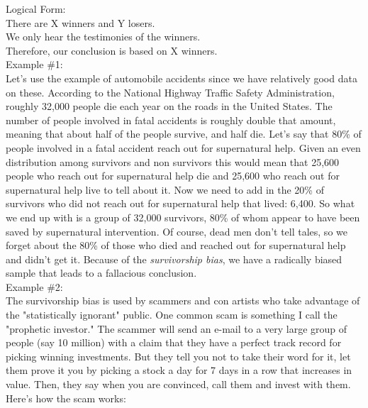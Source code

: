 \documentclass[a4paper,12pt,single,pdftex]{scrartcl}
\begin{document}
    
      Logical Form:
    \\

    
      There are X winners and Y losers.
    \\

    
      We only hear the testimonies of the winners.
    \\

    
      Therefore, our conclusion is based on X winners.
    \\

    
      Example \#1:
    \\

    
      Let's use the example of automobile accidents since we have relatively good data on these. According to the National Highway Traffic Safety Administration, roughly 32,000 people die each year on the roads in the United States. The number of people involved in fatal accidents is roughly double that amount, meaning that about half of the people survive, and half die. Let's say that 80\% of people involved in a fatal accident reach out for supernatural help. Given an even distribution among survivors and non survivors this would mean that 25,600 people who reach out for supernatural help die and 25,600 who reach out for supernatural help live to tell about it. Now we need to add in the 20\% of survivors who did not reach out for supernatural help that lived: 6,400. So what we end up with is a group of 32,000 survivors, 80\% of whom appear to have been saved by supernatural intervention. Of course, dead men don't tell tales, so we forget about the 80\% of those who died and reached out for supernatural help and didn't get it. Because of the {\it survivorship bias}, we have a radically biased sample that leads to a fallacious conclusion.
    \\

    
      Example \#2:
    \\

    
      The survivorship bias is used by scammers and con artists who take advantage of the "statistically ignorant" public. One common scam is something I call the "prophetic investor." The scammer will send an e-mail to a very large group of people (say 10 million) with a claim that they have a perfect track record for picking winning investments. But they tell you not to take their word for it, let them prove it you by picking a stock a day for 7 days in a row that increases in value. Then, they say when you are convinced, call them and invest with them. Here's how the scam works:
    \\
\end{document}
